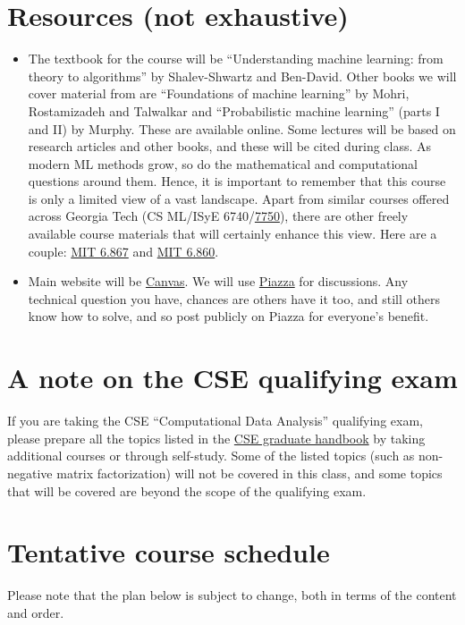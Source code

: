 \documentclass[12pt]{article}
\begin{document}
\section{Resources (not exhaustive)}
\label{sec:resources}
\begin{itemize}
	\item The textbook for the course will be ``Understanding machine learning: from theory to algorithms'' by Shalev-Shwartz and Ben-David. Other books we will cover material from are ``Foundations of machine learning'' by Mohri, Rostamizadeh and Talwalkar and ``Probabilistic machine learning'' (parts I and II) by Murphy. These are available online. Some lectures will be based on research articles and other books, and these will be cited during class. 
As modern ML methods grow, so do the mathematical and computational questions around them. Hence, it is important to remember that this course is only a limited view of a vast landscape. Apart from similar courses offered across Georgia Tech (CS ML/ISyE 6740/\href{https://sites.gatech.edu/ashwin-pananjady/7750-mathematical-foundations-of-machine-learning-fall-22/}{7750}), there are other freely available course materials that will certainly enhance this view. Here are a couple: \href{https://ocw.mit.edu/courses/6-867-machine-learning-fall-2006/}{MIT 6.867} and \href{http://www.mit.edu/~9.520/fall19/}{MIT 6.860}.

	\item Main website will be \href{https://canvas.gatech.edu}{Canvas}. We will use \href{https://piazza.com/gatech/fall2023/cse6740a/info}{Piazza} for discussions. Any technical question you have, chances are others have it too, and still others know how to solve, and so post publicly on Piazza for everyone's benefit. 
\end{itemize}
\section{A note on the CSE qualifying exam}
If you are taking the CSE ``Computational Data Analysis'' qualifying exam, please prepare all the topics listed in the \href{https://cse.gatech.edu/sites/default/files/documents/2023/Handbook-2023-06-07.pdf}{CSE graduate handbook} by taking additional courses or through self-study. Some of the listed topics (such as non-negative matrix factorization) will not be covered in this class, and some topics that will be covered are beyond the scope of the qualifying exam.
\
\section{Tentative course schedule}
Please note that the plan below is subject to change, both in terms of the content and order.
\end{document}
